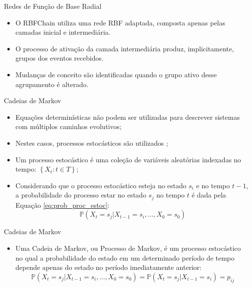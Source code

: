 \documentclass[10pt]{beamer}
\begin{document}
\begin{frame}{Redes de Função de Base Radial}
    \begin{itemize}
        \item<1 -> O RBFChain utiliza uma rede RBF adaptada, composta apenas pelas camadas inicial e intermediária.
        \item<1 -> O processo de ativação da camada intermediária produz, implicitamente, grupos dos eventos recebidos.
        \item<1 -> Mudanças de conceito são identificadas quando o grupo ativo desse agrupamento é alterado.
      \end{itemize}
\end{frame}


\begin{frame}{Cadeias de Markov}
    \begin{itemize}
        \item<1 -> Equações determinísticas não podem ser utilizadas para descrever sistemas com múltiplos caminhos evolutivos;
        \item<1 -> Nestes casos, \alert{processos estocásticos} são utilizados \cite{taylor1998introduction};
        \item<1 -> Um \alert{processo estocástico} é uma coleção de variáveis aleatórias indexadas no tempo: $\left\{ X _ { t } : t \in T \right\}$;
        \item<1 -> Considerando que o processo estocástico esteja no estado $s_i$ e no tempo $t - 1$, a probabilidade
        do processo estar no estado $s_j$ no tempo $t$ é dada pela Equação \ref{eq:prob_proc_estoc}:
        \begin{equation}
            \label{eq:prob_proc_estoc}
            \mathbb { P } \left( X _ { t } = s _ { j } | X _ { t - 1 } = s _ { i } , \ldots , X _ { 0 } = s _ { 0 } \right)
        \end{equation}
      \end{itemize}
\end{frame}

\begin{frame}{Cadeias de Markov}
    \begin{itemize}
        \item<1 -> Uma \alert{Cadeia de Markov}, ou \alert{Processo de Markov}, é um processo estocástico no qual a probabilidade do estado em um determinado período de tempo depende apenas do estado no período imediatamente anterior:
        \begin{equation}
            \label{eq:markov}
            \mathbb { P } \left( X _ { t } = s _ { j } | X _ { t - 1 } = s _ { i } , \ldots , X _ { 0 } = s _ { 0 } \right) = \mathbb { P } \left( X _ { t } = s _ { j } | X _ { t - 1 } = s _ { i } \right) = p _ { i j }
        \end{equation}
      \end{itemize}
\end{frame}
\end{document}
